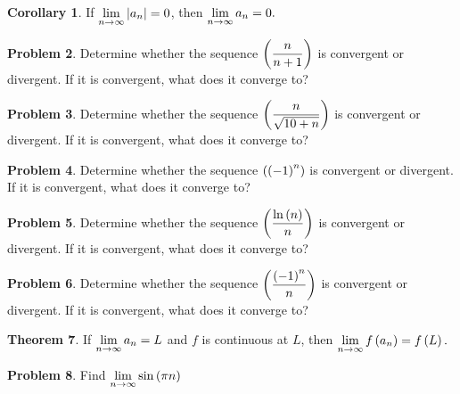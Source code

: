\documentclass[letterpaper, twoside, 12pt]{book}
\theoremstyle{definition}
\newtheorem{theorem}{Theorem}
\theoremstyle{definition}
\newtheorem{problem}[theorem]{Problem}
\newtheorem{corollary}[theorem]{Corollary}
\newcommand{\ds}{\ensuremath{\displaystyle}}
\begin{document}
\begin{corollary}
 If $\ds \lim_{n \rightarrow \infty} \left|a_n\right| = 0$, then $\ds \lim_{n \rightarrow \infty} a_n = 0.$
\end{corollary}

\begin{problem}
 Determine whether the sequence $\ds \left(\frac{n}{n+1}\right)$ is convergent or divergent.  If it is convergent, what does it converge to?
\end{problem}

\vfill

\begin{problem}
 Determine whether the sequence $\ds \left( \frac{n}{\sqrt{10+n}} \right)$ is convergent or divergent.  If it is convergent, what does it converge to?
\end{problem}

\vfill

\begin{problem}
 Determine whether the sequence $\ds \left( \left(-1\right)^n \right)$ is convergent or divergent.  If it is convergent, what does it converge to?
\end{problem}


\vfill

\begin{problem}
 Determine whether the sequence $\ds \left( \frac{\ln\left(n\right)}{n} \right)$ is convergent or divergent.  If it is convergent, what does it converge to?
\end{problem}

\vfill

\newpage

\begin{problem}
 Determine whether the sequence $\ds \left( \frac{\left(-1\right)^n}{n} \right)$ is convergent or divergent.  If it is convergent, what does it converge to?
\end{problem}

\vfill

\begin{theorem}
 If $\ds \lim_{n \rightarrow \infty} a_n = L$ and $f$ is continuous at $L$, then $\ds \lim_{n \rightarrow \infty} f\left(a_n\right) = f\left(L\right).$
\end{theorem}

\begin{problem}
 Find $\ds \lim_{n \rightarrow \infty} \sin\left(\pi n\right)$
\end{problem}

\vfill
\end{document}

